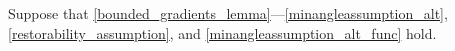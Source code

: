 Suppose that \cref{bounded_gradients_lemma}---\cref{minangleassumption_alt}, \cref{restorability_assumption}, and \cref{minangleassumption_alt_func} hold.
